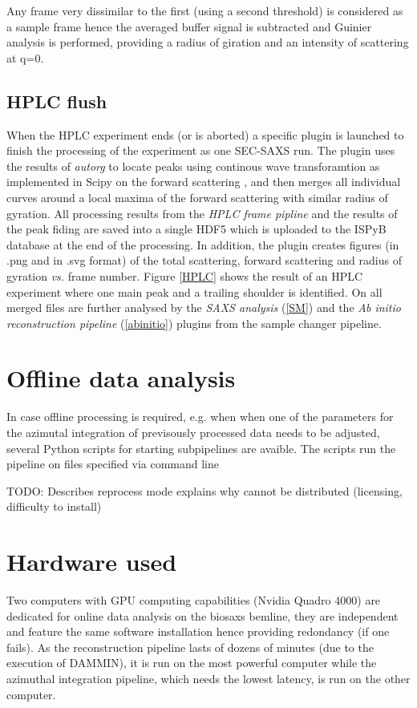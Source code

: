 \documentclass[preprint,pdf]{iucr}              %
\begin{document}
Any frame very dissimilar to the first (using a second threshold) is considered
as a sample frame hence the averaged buffer signal is subtracted and Guinier
analysis is performed, providing a radius of giration and an intensity of
scattering at q=0. 

\subsection{HPLC flush}
When the HPLC experiment ends (or is aborted) a specific plugin is launched to
finish the processing of the experiment as one SEC-SAXS run. 
The plugin uses the results of \textit{autorg} to locate peaks using continous
wave transforamtion as implemented in Scipy on the forward scattering
\cite{cwt, scipy}, and then merges all individual curves around a local maxima
of the forward scattering with similar radius of gyration. 
All processing results from the \textit{HPLC frame pipline} and the results of 
the peak fiding are saved into a single HDF5 which is uploaded to the ISPyB
database at the end of the processing. 
In addition, the plugin creates figures (in .png and in .svg format) of the
total scattering, forward scattering and radius of gyration \textit{vs.} frame
number. 
Figure \ref{HPLC} shows the result of an HPLC experiment where one main peak and
a trailing shoulder is identified. 
On all merged files are further analysed by the \textit{SAXS analysis}
(\ref{SM}) and the \textit{Ab initio reconstruction pipeline}
(\ref{abinitio}) plugins from the sample changer pipeline.

\section{Offline data analysis}
In case offline processing is required, e.g. when when one of the parameters for
the azimutal integration of previsously processed data needs to be adjusted, 
several Python scripts for starting subpipelines are avaible. 
The scripts run the pipeline on files specified via command line

TODO:
 Describes reprocess mode explains why cannot be distributed (licensing, difficulty to install)

\section{Hardware used}
Two computers with GPU computing capabilities (Nvidia Quadro 4000) are dedicated
for online data analysis on the biosaxs bemline, they are independent and
feature the same software installation hence providing redondancy (if one
fails).
As the  reconstruction pipeline lasts of dozens of minutes
(due to the execution of DAMMIN), it is run on the most powerful computer while
the azimuthal integration pipeline, which needs the lowest latency, is run on
the other computer.
\end{document}
